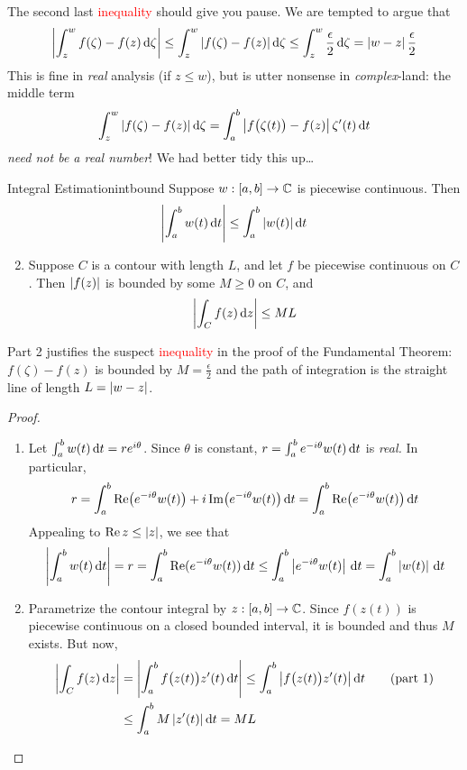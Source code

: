 The second last \textcolor{red}{inequality} should give you pause. We are tempted to argue that
\[
	\left| \int_z^wf(\zeta)-f(z)\,\mathrm{d}\zeta\right| \le \int_z^w\left| f(\zeta)-f(z)\right|\mathrm{d}\zeta \le \int_z^w\frac\epsilon 2\,\mathrm{d}\zeta =\left| w-z\right|\frac\epsilon 2
\]
This is fine in \emph{real} analysis (if $z\le w$), but is utter nonsense in \emph{complex}-land: the middle term
\[
	\int_z^w\left| f(\zeta)-f(z)\right|\mathrm{d}\zeta=\int_a^b\left| f\bigl(\zeta(t)\bigr)-f(z)\right|\zeta'(t)\,{\mathrm{d} t}
\]
\emph{need not be a real number}! We had better tidy this up\ldots

\goodbreak


\begin{thm}{Integral Estimation}{intbound}
	\exstart Suppose $w:[a,b]\to\mathbb{C}$ is piecewise continuous. Then
	\[
		\left| \int_a^bw(t)\,{\mathrm{d} t}\right|\le\int_a^b\left| w(t)\right|{\mathrm{d} t}
	\]
	\begin{enumerate}\setcounter{enumi}{1}
	  \item Suppose $C$ is a contour with length $L$, and let $f$ be piecewise continuous on $C$. Then $\left| f(z)\right|$ is bounded by some $M\ge 0$ on $C$, and 
		\[
			\left| \int_Cf(z)\,{\mathrm{d} z}\right|\le ML
		\]
	\end{enumerate}
\end{thm}

Part 2 justifies the suspect \textcolor{red}{inequality} in the proof of the Fundamental Theorem: $f(\zeta)-f(z)$ is bounded by $M=\frac\epsilon 2$ and the path of integration is the straight line of length $L=\left| w-z\right|$.


\begin{proof}
	\begin{enumerate}
	  \item Let $\int_a^bw(t)\,{\mathrm{d} t}=re^{i\theta}$. Since $\theta$ is constant, $r=\int_a^be^{-i\theta}w(t)\,{\mathrm{d} t}$ is \emph{real.} In particular,
		\[
			r=\int_a^b\operatorname{Re}\bigl(e^{-i\theta}w(t)\bigr)+i\operatorname{Im}\bigl(e^{-i\theta}w(t)\bigr)\,{\mathrm{d} t}
			=\int_a^b\operatorname{Re}\bigl(e^{-i\theta}w(t)\bigr)\,{\mathrm{d} t}
		\]
		Appealing to $\operatorname{Re} z\le\left| z\right|$, we see that
		\[
			\left| \int_a^bw(t)\,{\mathrm{d} t}\right|
			=r =\int_a^b\operatorname{Re}(e^{-i\theta}w(t))\,{\mathrm{d} t}
			\le \int_a^b\left| e^{-i\theta}w(t)\right|\,{\mathrm{d} t}
			=\int_a^b\left| w(t)\right|\,{\mathrm{d} t}
		\]
		\item Parametrize the contour integral by $z:[a,b]\to\mathbb{C}$. Since $f(z(t))$ is piecewise continuous on a closed bounded interval, it is bounded and thus $M$ exists. But now,
		\begin{align*}
			\left| \int_Cf(z)\,{\mathrm{d} z}\right|
			&=\left| \int_a^bf\bigl(z(t)\bigr)z'(t)\,{\mathrm{d} t}\right|\le \int_a^b\left| f\bigl(z(t)\bigr)z'(t)\right|{\mathrm{d} t} \tag{part 1}\\
			&\le \int_a^bM\left| z'(t)\right|{\mathrm{d} t}
			=ML \tag*{\qedhere}
		\end{align*}
	\end{enumerate}
\end{proof}

